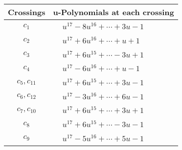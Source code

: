 \documentclass[1p]{elsarticle_modified}
\theoremstyle{definition}
\begin{document}
\begin{tabular}{m{50pt}|m{274pt}}
Crossings & \hspace{64pt}u-Polynomials at each crossing \\
\hline $$\begin{aligned}c_{1}\end{aligned}$$&$\begin{aligned}
&u^{17}-8 u^{16}+\cdots+3 u-1
\end{aligned}$\\
\hline $$\begin{aligned}c_{2}\end{aligned}$$&$\begin{aligned}
&u^{17}+6 u^{16}+\cdots+u+1
\end{aligned}$\\
\hline $$\begin{aligned}c_{3}\end{aligned}$$&$\begin{aligned}
&u^{17}+6 u^{15}+\cdots-3 u+1
\end{aligned}$\\
\hline $$\begin{aligned}c_{4}\end{aligned}$$&$\begin{aligned}
&u^{17}-6 u^{16}+\cdots+u-1
\end{aligned}$\\
\hline $$\begin{aligned}c_{5},c_{11}\end{aligned}$$&$\begin{aligned}
&u^{17}+6 u^{15}+\cdots+3 u-1
\end{aligned}$\\
\hline $$\begin{aligned}c_{6},c_{12}\end{aligned}$$&$\begin{aligned}
&u^{17}-3 u^{16}+\cdots+6 u-1
\end{aligned}$\\
\hline $$\begin{aligned}c_{7},c_{10}\end{aligned}$$&$\begin{aligned}
&u^{17}+6 u^{15}+\cdots+3 u+1
\end{aligned}$\\
\hline $$\begin{aligned}c_{8}\end{aligned}$$&$\begin{aligned}
&u^{17}+6 u^{15}+\cdots-3 u-1
\end{aligned}$\\
\hline $$\begin{aligned}c_{9}\end{aligned}$$&$\begin{aligned}
&u^{17}-5 u^{16}+\cdots+5 u-1
\end{aligned}$\\
\hline
\end{tabular}\\~\\
\end{document}
